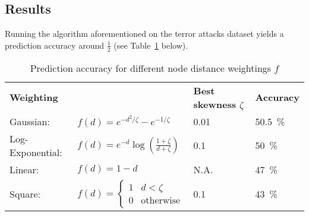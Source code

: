\subsection{Results}
\label{subsec:Results}

Running the algorithm aforementioned on the terror attacks dataset yields a prediction accuracy around $\frac{1}{2}$ (see Table~\ref{tab:Prediction accuracy for different node distance weightings} below).

\begin{table}[H]
\caption{Prediction accuracy for different node distance weightings $f$\vspace{-1em}}
\begin{center}
\begin{tabular}{l l l l}
\multicolumn{2}{l}{
\textbf{Weighting}}														& \textbf{Best skewness $\zeta$}		& \textbf{Accuracy}\\

Gaussian:			& $f(d)=e^{-d^2/\zeta}-e^{-1/\zeta}$							& \SI{0.01}{}						&\SI{50.5}{\percent} \\

Log-Exponential:	& $f(d)=e^{-d} \log\left( \frac{1+\zeta}{d+\zeta}\right)$				&\SI{0.1}{}							& \SI{50}{\percent} \\ 

Linear:			& $f(d)=1-d$											& N.A. 							&\SI{47}{\percent} \\

Square:			&$f(d)= \begin{cases}
1				&d < \zeta \\
0				& \text{otherwise}
				\end{cases}$											& \SI{0.1}{}						& \SI{43}{\percent}
\end{tabular}
\end{center}
\label{tab:Prediction accuracy for different node distance weightings}
\end{table}
